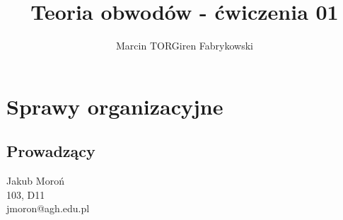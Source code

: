 \documentclass[a4paper,12pt]{article}
\title{Teoria obwodów - ćwiczenia 01}
\author{Marcin TORGiren Fabrykowski}
\begin{document}
\maketitle
\newpage
\section{Sprawy organizacyjne}
\subsection{Prowadzący}
Jakub Moroń\\
103, D11\\
jmoron@agh.edu.pl
\end{document}

